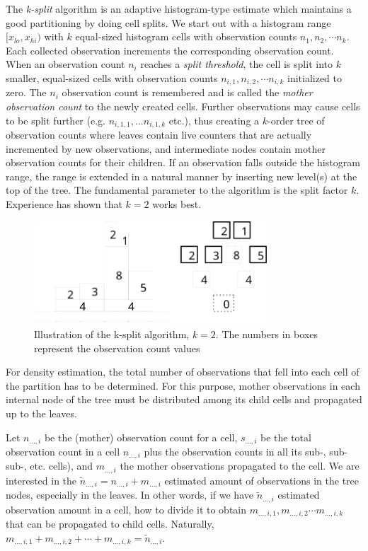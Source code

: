 The \textit{k-split} algorithm is an adaptive histogram-type estimate which
maintains a good partitioning by doing cell splits. We start out with
a histogram range $[x_{lo}, x_{hi})$ with $k$ equal-sized histogram
cells with observation counts $n_1,n_2, \cdots n_k$.  Each collected
observation increments the corresponding observation count. When an
observation count $n_i$ reaches a \textit{split threshold}, the cell
is split into $k$ smaller, equal-sized cells with observation counts
$n_{i,1}, n_{i,2}, \cdots n_{i,k}$ initialized to zero. The $n_i$
observation count is remembered and is called the \textit{mother
  observation count} to the newly created cells. Further observations
may cause cells to be split further (e.g. $n_{i,1,1},...n_{i,1,k}$
etc.), thus creating a $k$-order tree of observation counts where
leaves contain live counters that are actually incremented by new
observations, and intermediate nodes contain mother observation counts
for their children. If an observation falls outside the histogram
range, the range is extended in a natural manner by inserting new
level(s) at the top of the tree. The fundamental parameter to the
algorithm is the split factor $k$. Experience has shown that $k=2$
works best.

\begin{figure}[htbp]
  \begin{center}
    \includegraphics[width=3.442in, height=1.518in]{figures/simlib-ksplit1}
    \caption{Illustration of the k-split algorithm, $k=2$. The
      numbers in boxes represent the observation count values}
  \end{center}
\end{figure}


For density estimation, the total number of observations that
fell into each cell of the partition has to be determined. For
this purpose, mother observations in each internal node of the
tree must be distributed among its child cells and propagated
up to the leaves.


Let $n_{...,i}$ be the (mother) observation count for a cell,
$s_{...,i}$ be the total observation count in a cell $n_{...,i}$ plus
the observation counts in all its sub-, sub-sub-, etc. cells), and
$m_{...,i}$ the mother observations propagated to the cell. We are
interested in the $\tilde{n}_{...,i} = n_{...,i} + m_{...,i}$
estimated amount of observations in the tree nodes, especially in the
leaves. In other words, if we have $\tilde{n}_{...,i}$ estimated
observation amount in a cell, how to divide it to obtain
$m_{...,i,1}, m_{...,i,2} \cdots m_{...,i,k}$
that can be propagated to child cells. Naturally,
$m_{...,i,1} + m_{...,i,2} + \cdots + m_{...,i,k} = \tilde{n}_{...,i}$.

